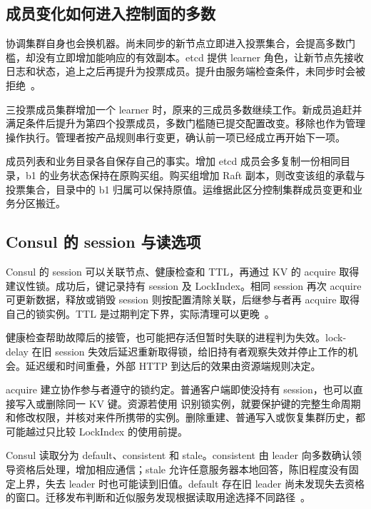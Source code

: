 \subsection*{成员变化如何进入控制面的多数}

协调集群自身也会换机器。尚未同步的新节点立即进入投票集合，会提高多数门槛，却没有立即增加能响应的有效副本。etcd 提供 learner 角色，让新节点先接收日志和状态，追上之后再提升为投票成员。提升由服务端检查条件，未同步时会被拒绝~\cite{etcd-37-reconfigure}。

三投票成员集群增加一个 learner 时，原来的三成员多数继续工作。新成员追赶并满足条件后提升为第四个投票成员，多数门槛随已提交配置改变。移除也作为管理操作执行。管理者按产品规则串行变更，确认前一项已经成立再开始下一项。


成员列表和业务目录各自保存自己的事实。增加 etcd 成员会多复制一份相同目录，b1 的业务状态保持在原购买组。购买组增加 Raft 副本，则改变该组的承载与投票集合，目录中的 b1 归属可以保持原值。运维据此区分控制集群成员变更和业务分区搬迁。

\subsection*{Consul 的 session 与读选项}

Consul 的 session 可以关联节点、健康检查和 TTL，再通过 KV 的 acquire 取得建议性锁。成功后，键记录持有 session 及 LockIndex。相同 session 再次 acquire 可更新数据，释放或销毁 session 则按配置清除关联，后继参与者再 acquire 取得自己的锁实例。TTL 是过期判定下界，实际清理可以更晚~\cite{consul-sessions}。

健康检查帮助故障后的接管，也可能把存活但暂时失联的进程判为失效。lock-delay 在旧 session 失效后延迟重新取得锁，给旧持有者观察失效并停止工作的机会。延迟缓和时间重叠，外部 HTTP 到达后的效果由资源端规则决定。

acquire 建立协作参与者遵守的锁约定。普通客户端即使没持有 session，也可以直接写入或删除同一 KV 键。资源若使用  识别锁实例，就要保护键的完整生命周期和修改权限，并核对来件所携带的实例。删除重建、普通写入或恢复集群历史，都可能越过只比较 LockIndex 的使用前提。

Consul 读取分为 default、consistent 和 stale。consistent 由 leader 向多数确认领导资格后处理，增加相应通信；stale 允许任意服务器本地回答，陈旧程度没有固定上界，失去 leader 时也可能读到旧值。default 存在旧 leader 尚未发现失去资格的窗口。迁移发布判断和近似服务发现根据读取用途选择不同路径~\cite{consul-consistency}。

